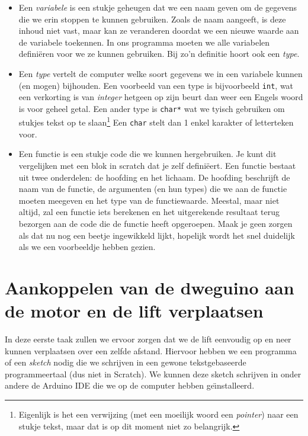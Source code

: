 \documentclass[a4paper, 10pt]{article}
\begin{document}
\begin{itemize}
\item
    Een {\em variabele} is een stukje geheugen dat we een naam geven om de gegevens die we erin stoppen te kunnen gebruiken.
    Zoals de naam aangeeft, is deze inhoud niet vast, maar kan ze veranderen doordat we een nieuwe waarde aan de variabele toekennen.
    In ons programma moeten we alle variabelen defini\"eren voor we ze kunnen gebruiken. Bij zo'n definitie hoort ook een {\em type}.
\item
    Een {\em type} vertelt de computer welke soort gegevens we in een variabele kunnen (en mogen) bijhouden. Een voorbeeld
    van een type is bijvoorbeeld \texttt{int}, wat een verkorting is van {\em integer} hetgeen op zijn beurt dan weer
    een Engels woord is voor geheel getal. Een ander type is \texttt{char*} wat we tyisch gebruiken om stukjes tekst op
    te slaan\footnote{Eigenlijk is het een verwijzing (met een moeilijk woord een {\em pointer}) naar een stukje tekst, maar dat is
    op dit moment niet zo belangrijk.} Een \texttt{char} stelt dan 1 enkel karakter of letterteken voor.
\item
    Een functie is een stukje code die we kunnen hergebruiken. Je kunt dit vergelijken met een blok in scratch dat je zelf
    defini\"eert. Een functie bestaat uit twee onderdelen: de hoofding en het lichaam. De hoofding beschrijft de naam van
    de functie, de argumenten (en hun types) die we aan de functie moeten meegeven en het type van de functiewaarde. Meestal,
    maar niet altijd, zal een functie iets berekenen en het uitgerekende resultaat terug bezorgen aan de code die de functie
    heeft opgeroepen. Maak je geen zorgen als dat nu nog een beetje ingewikkeld lijkt, hopelijk wordt het snel duidelijk
    als we een voorbeeldje hebben gezien.
\end{itemize}


\section{Aankoppelen van de dweguino aan de motor en de lift verplaatsen}

In deze eerste taak zullen we ervoor zorgen dat we de lift eenvoudig op en neer kunnen verplaatsen over een zelfde
afstand. Hiervoor hebben we een programma of een {\em sketch} nodig die we schrijven in een gewone tekstgebaseerde
programmeertaal (dus niet in Scratch). We kunnen deze sketch schrijven in onder andere de Arduino IDE die we op de
computer hebben ge\"\i nstalleerd.
\end{document}
